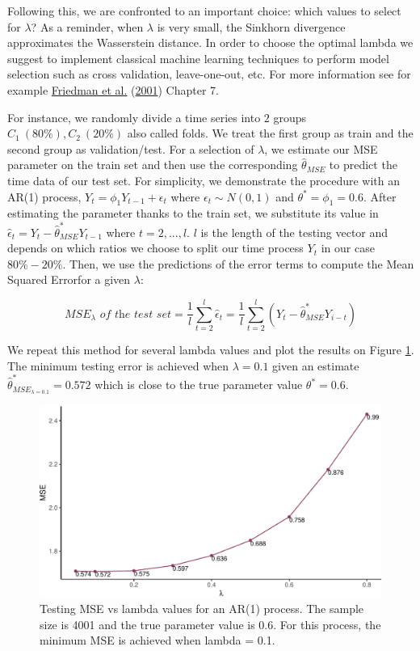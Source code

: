\documentclass[
  11pt,
]{article}
\begin{document}
Following this, we are confronted to an important choice: which values
to select for \(\lambda\)? As a reminder, when \(\lambda\) is very
small, the Sinkhorn divergence approximates the Wasserstein distance. In
order to choose the optimal lambda we suggest to implement classical
machine learning techniques to perform model selection such as cross
validation, leave-one-out, etc. For more information see for example
\protect\hyperlink{ref-friedman2001elements}{Friedman et al.}
(\protect\hyperlink{ref-friedman2001elements}{2001}) Chapter 7.

For instance, we randomly divide a time series into \(2\) groups
\(C_1 \ (80\%), C_2 \ (20\%)\) also called folds. We treat the first
group as train and the second group as validation/test. For a selection
of \(\lambda\), we estimate our MSE parameter on the train set and then
use the corresponding \(\hat \theta_{MSE}\) to predict the time data of
our test set. For simplicity, we demonstrate the procedure with an AR(1)
process, \(Y_t = \phi_1 Y_{t-1} + \epsilon_t\) where
\(\epsilon_t \sim N(0,1)\) and \(\theta^* = \phi_1 = 0.6\). After
estimating the parameter thanks to the train set, we substitute its
value in \(\hat \epsilon_t = Y_t - \hat \theta^*_{MSE} Y_{t-1}\) where
\(t = 2, ..., l\). \(l\) is the length of the testing vector and depends
on which ratios we choose to split our time process \({Y_t}\) in our
case \(80\% - 20\%\). Then, we use the predictions of the error terms to
compute the Mean Squared Errorfor a given \(\lambda\):

\[MSE_{\lambda} \textit{ of the test set} = \frac{1}{l}\sum_{t = 2}^l \hat \epsilon_t = \frac{1}{l} \sum_{t = 2}^l (Y_t - \hat \theta^*_{MSE} Y_{i-t})\]

We repeat this method for several lambda values and plot the results on
Figure \ref{fig:SH_CV}. The minimum testing error is achieved when
\(\lambda = 0.1\) given an estimate
\(\hat \theta^*_{MSE_{\lambda = 0.1}} = 0.572\) which is close to the
true parameter value \(\theta^* = 0.6\).

\begin{figure}

{\centering \includegraphics[width=0.75\linewidth]{Master_thesis_V1_files/figure-latex/SH_CV-1} 

}

\caption{Testing MSE vs lambda values for an AR(1) process. The sample size is  4001 and the true parameter value is 0.6. For this process, the minimum MSE is achieved when lambda = 0.1.}\label{fig:SH_CV}
\end{figure}
\end{document}

